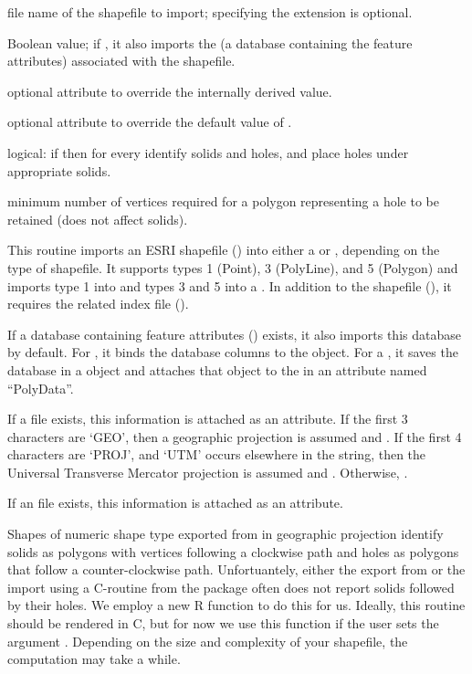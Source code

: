 \documentclass[letterpaper]{book}
\begin{document}
%
\begin{Arguments}
\begin{ldescription}
\item[\code{fn}] file name of the shapefile to import; specifying the
extension is optional.
\item[\code{readDBF}] Boolean value; if , it also imports the 
 (a database containing the feature attributes) associated with the
shapefile.
\item[\code{projection}] optional  attribute to override the
internally derived value.
\item[\code{zone}] optional  attribute to override the default
value of .
\item[\code{placeholes}] logical: if  then for every  
identify solids and holes, and place holes under appropriate solids.
\item[\code{minverts}] minimum number of vertices required for a polygon 
representing a hole to be retained (does not affect solids).
\end{ldescription}
\end{Arguments}
%
\begin{Details}\relax
This routine imports an ESRI shapefile () into either a
 or , depending on the type of
shapefile.  It supports types 1 (Point), 3 (PolyLine), and 5 (Polygon)
and imports type 1 into  and types 3 and 5 into a
.  In addition to the shapefile (), it
requires the related index file ().

If a database containing feature attributes () exists, it
also imports this database by default.  For , it binds
the database columns to the  object.  For a
, it saves the database in a  object and
attaches that object to the  in an attribute named
``PolyData''.

If a  file exists, this information is attached as an attribute.
If the first 3 characters are `GEO', then a geographic projection 
is assumed and . If the first 4 characters are 
`PROJ', and `UTM' occurs elsewhere in the string, then the 
Universal Transverse Mercator projection is assumed and . 
Otherwise, .

If an  file exists, this information is attached as an attribute.

Shapes of numeric shape type  exported from  in geographic 
projection identify solids as polygons with vertices following a clockwise 
path and holes as polygons that follow a counter-clockwise path. 
Unfortuantely, either the export from  or the import using a C-routine 
from the package  often does not report solids followed by their holes. 
We employ a new R function  to do this for us. 
Ideally, this routine should be rendered in C, but for now we use this 
function if the user sets the argument . 
Depending on the size and complexity of your shapefile, the computation may take a while.
\end{Details}
\end{document}
